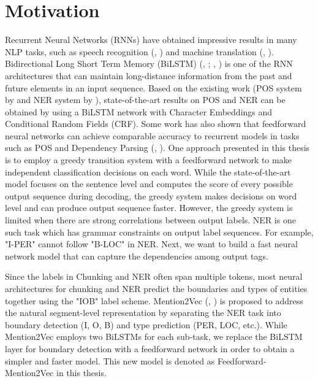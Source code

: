 \section{Motivation}
Recurrent Neural Networks (RNNs) have obtained impressive results in many NLP tasks, such as speech recognition (\citeauthor{graves2013speech}, \citeyear{graves2013speech}) and machine translation (\citeauthor{cho2014properties}, \citeyear{cho2014properties}).
Bidirectional Long Short Term Memory (BiLSTM) (\citeauthor{Hochreiter97longshort-term}, \citeyear{Hochreiter97longshort-term}; \citeauthor{graves2005framewise}, \citeyear{graves2005framewise}) is one of the RNN architectures that can maintain long-distance information from the past and future elements in an input sequence. Based on the existing work (POS system by \cite{ling2015finding} and NER system by \cite{lample2016neural}), state-of-the-art results on POS and NER can be obtained by using a BiLSTM network with Character Embeddings and Conditional Random Fields (CRF). Some work has also shown that feedforward neural networks can achieve comparable accuracy to recurrent models in tasks such as POS and Dependency Parsing (\citeauthor{andor2016globally}, \citeyear{andor2016globally}). One approach presented in this thesis is to employ a greedy transition system with a feedforward network to make independent classification decisions on each word. While the state-of-the-art model focuses on the sentence level and computes the score of every possible output sequence during decoding, the greedy system makes decisions on word level and can produce output sequence faster. However, the greedy system is limited when there are strong correlations between output labels. NER is one such task which has grammar constraints on output label sequences. For example, "I-PER" cannot follow "B-LOC" in NER. Next, we want to build a fast neural network model that can capture the dependencies among output tags.

Since the labels in Chunking and NER often span multiple tokens, most neural architectures for chunking and NER predict the boundaries and types of entities together using the "IOB" label scheme. Mention2Vec (\citeauthor{stratos2016mention2vec}, \citeyear{stratos2016mention2vec}) is proposed to address the natural segment-level representation by separating the NER task into boundary detection (I, O, B) and type prediction (PER, LOC, etc.). While Mention2Vec employs two BiLSTMs for each sub-task, we replace the BiLSTM layer for boundary detection with a feedforward network in order to obtain a simpler and faster model. This new model is denoted as Feedforward-Mention2Vec in this thesis.

